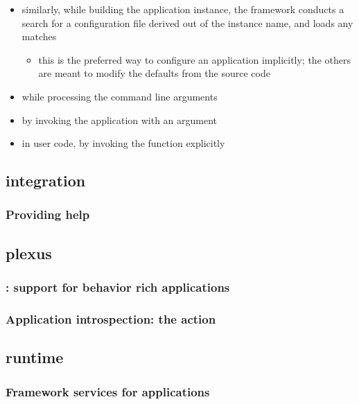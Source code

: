 \begin{frame}
\begin{itemize}
\begin{itemize}
    \end{itemize}
%
  \item similarly, while building the application instance, the framework conducts a search for
    a configuration file derived out of the instance name, and loads any matches
    \begin{itemize}
    \item this is the preferred way to configure an application implicitly; the others are
      meant to modify the defaults from the source code
    \end{itemize}
%
  \item while processing the command line arguments
%
  \item by invoking the application with an  argument
%
  \item in user code, by invoking the function  explicitly
%
  \end{itemize}
%
\end{frame}

\subsection{integration}
\begin{frame}
%
  \frametitle{Providing help}
%
\end{frame}

\subsection{plexus}
\begin{frame}
%
  \frametitle{: support for behavior rich applications}
%
\end{frame}

\begin{frame}
%
  \frametitle{Application introspection: the action }
%
\end{frame}

\subsection{runtime}
\begin{frame}
%
  \frametitle{Framework services for applications}
%
\end{frame}

